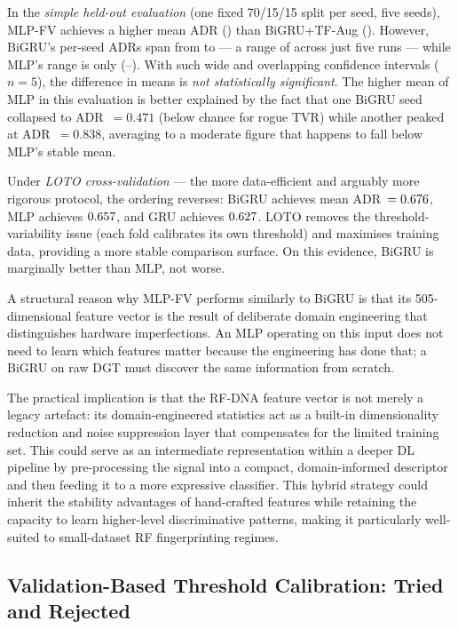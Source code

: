 In the \emph{simple held-out evaluation} (one fixed 70/15/15 split per seed,
five seeds), MLP-FV achieves a higher mean ADR (\mlpADR) than
BiGRU+TF-Aug (\bigruADR).
However, BiGRU's per-seed ADRs span from \bigruSeedADRMin{} to \bigruSeedADRMax{} --- a range of \bigruSeedADRRange{}
across just five runs --- while MLP's range is only \mlpSeedADRRange{} (\mlpSeedADRMin--\mlpSeedADRMax).
With such wide and overlapping confidence intervals ($n=5$), the difference in means is \emph{not statistically significant}.
The higher mean of MLP in this evaluation is better explained by the fact that one BiGRU seed collapsed to ADR~$=0.471$ (below chance for rogue TVR) while another peaked at ADR~$=0.838$, averaging to a moderate figure that happens to fall below MLP's stable mean.

Under \emph{LOTO cross-validation} --- the more data-efficient and arguably
more rigorous protocol, the ordering reverses:
BiGRU achieves mean ADR~$=0.676$, MLP achieves $0.657$, and GRU achieves
$0.627$.
LOTO removes the threshold-variability issue (each fold calibrates its own threshold) and maximises training data, providing a more stable comparison surface.
On this evidence, BiGRU is marginally better than MLP, not worse.

A structural reason why MLP-FV performs similarly to BiGRU is that its 505-dimensional feature vector is the result of deliberate
domain engineering that distinguishes hardware imperfections.
An MLP operating on this input does not need to learn which features matter
because the engineering has done that; a BiGRU on raw DGT must discover
the same information from scratch.

The practical implication is that the RF-DNA feature vector is not merely a legacy artefact: its domain-engineered statistics act as a built-in dimensionality reduction and noise suppression layer that compensates for the limited training set. This could serve as an intermediate representation within a deeper DL pipeline by pre-processing the signal into a compact, domain-informed descriptor and then feeding it to a more expressive classifier. This hybrid strategy could inherit the stability advantages of hand-crafted features while retaining the capacity to learn higher-level discriminative patterns, making it particularly well-suited to small-dataset RF fingerprinting regimes.

\subsection{Validation-Based Threshold Calibration: Tried and Rejected}


